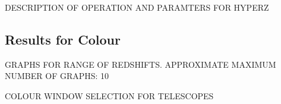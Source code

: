 		DESCRIPTION OF OPERATION AND PARAMTERS FOR HYPERZ


	\subsection{Results for Colour} %
	\label{sub:Results_for_Colour}
		GRAPHS FOR RANGE OF REDSHIFTS. APPROXIMATE MAXIMUM NUMBER OF GRAPHS: 10

		COLOUR WINDOW SELECTION FOR TELESCOPES


